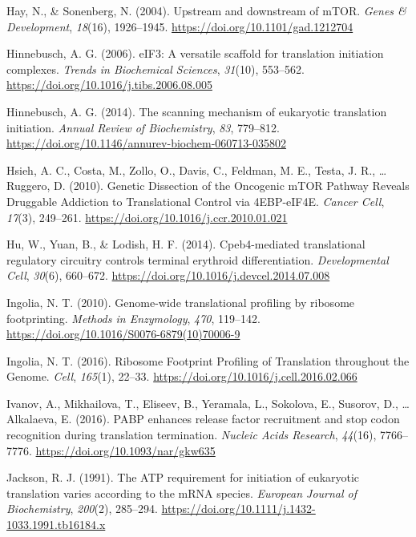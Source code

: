 \documentclass[12pt,openany]{book}
\begin{document}
\hypertarget{ref-Hay2004}{}
Hay, N., \& Sonenberg, N. (2004). Upstream and downstream of mTOR.
\emph{Genes \& Development}, \emph{18}(16), 1926--1945.
\url{https://doi.org/10.1101/gad.1212704}

\hypertarget{ref-Hinnebusch2006}{}
Hinnebusch, A. G. (2006). eIF3: A versatile scaffold for translation
initiation complexes. \emph{Trends in Biochemical Sciences},
\emph{31}(10), 553--562.
\url{https://doi.org/10.1016/j.tibs.2006.08.005}

\hypertarget{ref-Hinnebusch2014}{}
Hinnebusch, A. G. (2014). The scanning mechanism of eukaryotic
translation initiation. \emph{Annual Review of Biochemistry}, \emph{83},
779--812. \url{https://doi.org/10.1146/annurev-biochem-060713-035802}

\hypertarget{ref-Hsieh2010}{}
Hsieh, A. C., Costa, M., Zollo, O., Davis, C., Feldman, M. E., Testa, J.
R., \ldots{} Ruggero, D. (2010). Genetic Dissection of the Oncogenic
mTOR Pathway Reveals Druggable Addiction to Translational Control via
4EBP-eIF4E. \emph{Cancer Cell}, \emph{17}(3), 249--261.
\url{https://doi.org/10.1016/j.ccr.2010.01.021}

\hypertarget{ref-Hu2014}{}
Hu, W., Yuan, B., \& Lodish, H. F. (2014). Cpeb4-mediated translational
regulatory circuitry controls terminal erythroid differentiation.
\emph{Developmental Cell}, \emph{30}(6), 660--672.
\url{https://doi.org/10.1016/j.devcel.2014.07.008}

\hypertarget{ref-Ingolia2010}{}
Ingolia, N. T. (2010). Genome-wide translational profiling by ribosome
footprinting. \emph{Methods in Enzymology}, \emph{470}, 119--142.
\url{https://doi.org/10.1016/S0076-6879(10)70006-9}

\hypertarget{ref-Ingolia2016}{}
Ingolia, N. T. (2016). Ribosome Footprint Profiling of Translation
throughout the Genome. \emph{Cell}, \emph{165}(1), 22--33.
\url{https://doi.org/10.1016/j.cell.2016.02.066}

\hypertarget{ref-Ivanov2016}{}
Ivanov, A., Mikhailova, T., Eliseev, B., Yeramala, L., Sokolova, E.,
Susorov, D., \ldots{} Alkalaeva, E. (2016). PABP enhances release factor
recruitment and stop codon recognition during translation termination.
\emph{Nucleic Acids Research}, \emph{44}(16), 7766--7776.
\url{https://doi.org/10.1093/nar/gkw635}

\hypertarget{ref-Jackson1991}{}
Jackson, R. J. (1991). The ATP requirement for initiation of eukaryotic
translation varies according to the mRNA species. \emph{European Journal
of Biochemistry}, \emph{200}(2), 285--294.
\url{https://doi.org/10.1111/j.1432-1033.1991.tb16184.x}
\end{document}
